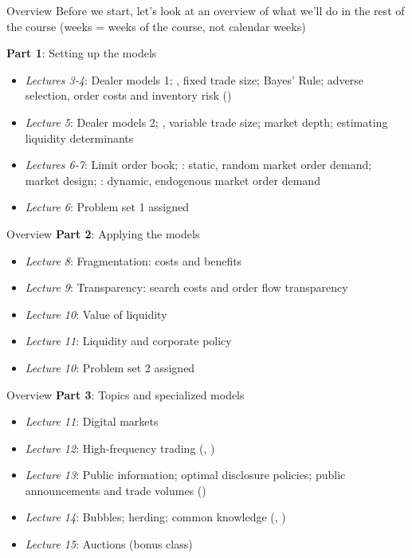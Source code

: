 \documentclass[english,10pt
,aspectratio=169
]{beamer}
\begin{document}
\begin{frame}{Overview}
	Before we start, let's look at an overview of what we'll do in the rest of the course (weeks = weeks of the course, not calendar weeks)
	
	\textbf{Part 1}: Setting up the models
	\begin{itemize}
	\item \textit{Lectures 3-4}: Dealer models 1; , fixed trade size; Bayes' Rule; adverse selection, order costs and inventory risk ()
	\item \textit{Lecture 5}: Dealer models 2; , variable trade size; market depth; estimating liquidity determinants
	\item \textit{Lectures 6-7}: Limit order book; : static, random market order demand; market design; : dynamic, endogenous market order demand
	\item \textit{Lecture 6}: Problem set 1 assigned
	\end{itemize}
\end{frame}


\begin{frame}{Overview}
\textbf{Part 2}: Applying the models
\begin{itemize}
	\item \textit{Lecture 8}: Fragmentation: costs and benefits
	\item \textit{Lecture 9}: Transparency: search costs and order flow transparency
	\item \textit{Lecture 10}: Value of liquidity
	\item \textit{Lecture 11}: Liquidity and corporate policy
	\item \textit{Lecture 10}: Problem set 2 assigned
\end{itemize}
\end{frame}


\begin{frame}{Overview}
\textbf{Part 3}: Topics and specialized models
\begin{itemize}
	\item \textit{Lecture 11}: Digital markets
	\item \textit{Lecture 12}: High-frequency trading (, )
	\item \textit{Lecture 13}: Public information; optimal disclosure policies; public announcements and trade volumes ()
	\item \textit{Lecture 14}: Bubbles; herding; common knowledge (, )
	\item \textit{Lecture 15}: Auctions (bonus class)
\end{itemize}
\end{frame}
\end{document}
